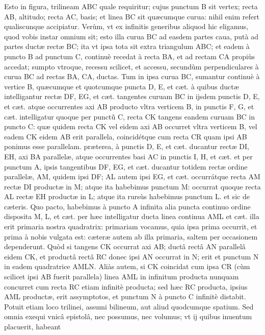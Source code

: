 \documentclass[11pt,a4paper]{article}
\begin{document}
Esto in figura, trilineam ABC quale requiritur; cujus punctum B sit vertex; recta AB, altitudo; recta AC, basis; et linea BC sit quæcumque curua: nihil enim refert qualiscunque accipiatur. Verùm, vt ex infinitis generibus aliquod hic eligamus, quod vobis instar omnium sit; esto illa curua BC ad easdem partes caua, putà ad partes ductæ rectæ BC; ita vt ipsa tota sit extra triangulum ABC; et eadem à puncto B ad punctum C, continuè recedat à recta BA, et ad rectam CA propiùs accedat; sumpto vtroque, recessu scilicet, et accessu, secundùm perpendiculares à curua BC ad rectas BA, CA, ductas. Tum in ipsa curua BC, sumantur continuè à vertice B, quæcumque et quotcumque puncta D, E, et cæt. à quibus ductæ intelligantur rectæ DF, EG, et cæt. tangentes curuam BC in ijsdem punctis D, E, et cæt. atque occurrentes axi AB producto vltra verticem B, in punctis F, G, et cæt. intelligatur quoque per punctũ C, recta CK tangens eandem curuam BC in puncto C: quæ quidem recta CK vel eidem axi AB occurret vltra verticem B, vel eadem CK eidem AB erit parallela, coincidétque cum recta CR quam ipsi AB ponimus esse parallelam. præterea, à punctis D, E, et cæt. ducantur rectæ DI, EH, axi BA parallelæ, atque occurrentes basi AC in punctis I, H, et cæt. et per punctum A, ipsis tangentibus DF, EG, et cæt. ducantur totidem rectæ ordine parallelæ, AM, quidem ipsi DF; AL autem ipsi EG, et cæt. occurrátque recta AM rectæ DI productæ in M; atque ita habebimus punctum M: occurrat quoque recta AL rectæ EH productæ in L; atque ita rursùs habebimus punctum L. et sic de cæteris. Quo pacto, habebimus à puncto A infinita alia puncta continuo ordine disposita M, L, et cæt. per hæc intelligatur ducta linea continua AML et cæt. illa erit primaria nostra quadratrix: primariam vocamus, quia ipsa prima occurrit, et prima à nobis vulgata est: cæteræ autem ab illa primaria, saltem per occasionem dependerunt. Quòd si tangens CK occurrat axi AB; ductâ rectâ AN parallelâ eidem CK, et productâ rectâ RC donec ipsi AN occurrat in N; erit et punctum N in eadem quadratrice AMLN. Aliàs autem, si CK coincidat cum ipsa CR (cùm scilicet ipsi AB fuerit parallela) linea AML in infinitum producta nunquam concurret cum recta RC etiam infinitè producta; sed hæc RC producta, ipsius AML productæ, erit assymptotos, et punctum N à puncto C infinitè distabit. Potuit etiam loco trilinei, assumi bilineum, aut aliud quodcumque spatium. Sed omnia exequi vnicâ epistolâ, nec possumus, nec volumus; vt ij quibus inuentum placuerit, habeant
\end{document}
